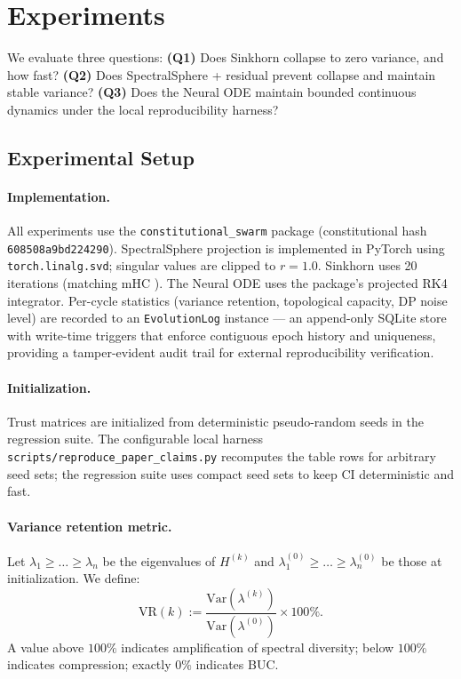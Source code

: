 \section{Experiments}
\label{sec:experiments}

We evaluate three questions:
\textbf{(Q1)} Does Sinkhorn collapse to zero variance, and how fast?
\textbf{(Q2)} Does SpectralSphere + residual prevent collapse and maintain stable variance?
\textbf{(Q3)} Does the Neural ODE maintain bounded continuous dynamics under the local
reproducibility harness?

\subsection{Experimental Setup}

\paragraph{Implementation.}
All experiments use the \texttt{constitutional\_swarm} package
(constitutional hash \texttt{608508a9bd224290}).
SpectralSphere projection is implemented in PyTorch using
\texttt{torch.linalg.svd}; singular values are clipped to $r=1.0$.
Sinkhorn uses 20 iterations (matching mHC \cite{xie2025mhc}).
The Neural ODE uses the package's projected RK4 integrator.
Per-cycle statistics (variance retention, topological capacity, DP noise level) are
recorded to an \texttt{EvolutionLog} instance — an append-only SQLite store with
write-time triggers that enforce contiguous epoch history and uniqueness, providing a
tamper-evident audit trail for external reproducibility verification.

\paragraph{Initialization.}
Trust matrices are initialized from deterministic pseudo-random seeds in the regression
suite.  The configurable local harness \texttt{scripts/reproduce\_paper\_claims.py}
recomputes the table rows for arbitrary seed sets; the regression suite uses compact
seed sets to keep CI deterministic and fast.

\paragraph{Variance retention metric.}
Let $\lambda_1 \geq \ldots \geq \lambda_n$ be the eigenvalues of $H^{(k)}$ and
$\lambda_1^{(0)} \geq \ldots \geq \lambda_n^{(0)}$ be those at initialization.  We define:
\[
  \mathrm{VR}(k) := \frac{\mathrm{Var}(\lambda^{(k)})}{\mathrm{Var}(\lambda^{(0)})}
    \times 100\%.
\]
A value above $100\%$ indicates amplification of spectral diversity; below $100\%$ indicates
compression; exactly $0\%$ indicates BUC.

